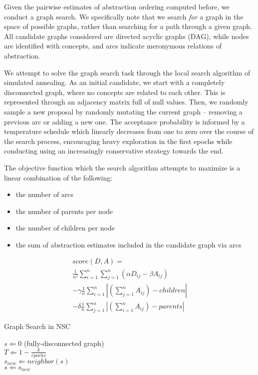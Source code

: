 Given the pairwise estimates of abstraction ordering computed before, we conduct a graph search. We specifically note that we search \textit{for} a graph in the space of possible graphs, rather than searching for a path through a given graph. All candidate graphs considered are directed acyclic graphs (DAG), while nodes are identified with concepts, and arcs indicate meronymous relations of abstraction.

We attempt to solve the graph search task through the local search algorithm of simulated annealing. As an initial candidate, we start with a completely disconnected graph, where no concepts are related to each other. This is represented through an adjacency matrix full of null values. Then, we randomly sample a new proposal by randomly mutating the current graph -- removing a previous arc or adding a new one. The acceptance probability is informed by a temperature schedule which linearly decreases from one to zero over the course of the search process, encouraging heavy exploration in the first epochs while conducting using an increasingly conservative strategy towards the end.

The objective function which the search algorithm attempts to maximize is a linear combination of the following:

\begin{itemize}
    \item the number of arcs
    \item the number of parents per node
    \item the number of children per node
    \item the sum of abstraction estimates included in the candidate graph via arcs
\end{itemize}

\begin{align*}
    score(D, A) = \\
        \frac{1}{n^2} \sum_{i=1}^{n} \sum_{j=1}^{n} (\alpha D_{ij} - \beta A_{ij}) \\
    - \gamma \frac{1}{n} \sum_{i=1}^{n} \left|(\sum_{j=1}^{n}A_{ij}) - children\right| \\
    - \delta \frac{1}{n} \sum_{j=1}^{n} \left|(\sum_{i=1}^{n}A_{ij}) - parents\right|
\end{align*}

\begin{algorithm}[!tbp] 
    \caption{Graph Search in NSC}
    \label{alg:gs}
    \begin{algorithmic}
        \STATE $s \Leftarrow 0 $ (fully-disconnected graph) \\
        \STATE $T \Leftarrow 1 - \frac{k}{epochs}$ \\
        \STATE $s_{new} \Leftarrow neighbor(s)$ \\
            \STATE $s \Leftarrow s_{new}$
        \ENDIF
        \ENDFOR
    \end{algorithmic}
\end{algorithm}

